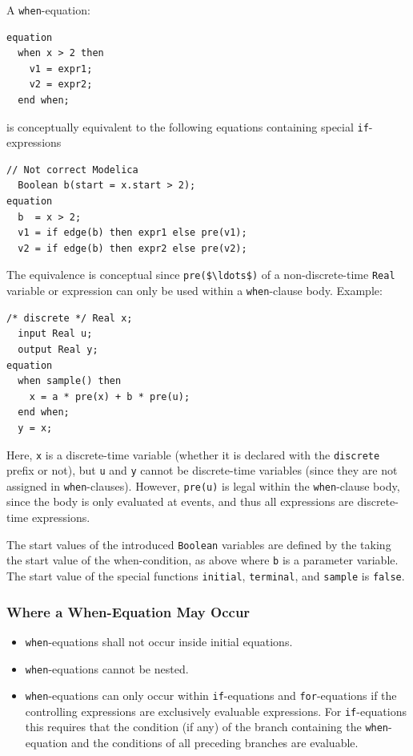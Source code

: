 A \lstinline!when!-equation:
\begin{lstlisting}[language=modelica]
equation
  when x > 2 then
    v1 = expr1;
    v2 = expr2;
  end when;
\end{lstlisting}
is conceptually equivalent to the following equations containing special \lstinline!if!-expressions
\begin{lstlisting}[language=modelica]
  // Not correct Modelica
  Boolean b(start = x.start > 2);
equation
  b  = x > 2;
  v1 = if edge(b) then expr1 else pre(v1);
  v2 = if edge(b) then expr2 else pre(v2);
\end{lstlisting}

\begin{nonnormative}
The equivalence is conceptual since \lstinline!pre($\ldots$)! of a non-discrete-time \lstinline!Real! variable or expression can only be used within a \lstinline!when!-clause body.
Example:
\begin{lstlisting}[language=modelica]
  /* discrete */ Real x;
  input Real u;
  output Real y;
equation
  when sample() then
    x = a * pre(x) + b * pre(u);
  end when;
  y = x;
\end{lstlisting}

Here, \lstinline!x! is a discrete-time variable (whether it is declared with the \lstinline!discrete! prefix or not), but \lstinline!u! and \lstinline!y! cannot be discrete-time variables
(since they are not assigned in \lstinline!when!-clauses).
However, \lstinline!pre(u)! is legal within the \lstinline!when!-clause body, since the body is only evaluated at events, and thus all expressions are discrete-time expressions.
\end{nonnormative}

The start values of the introduced \lstinline!Boolean! variables are defined by the taking the start value of the when-condition, as above where \lstinline!b! is a parameter variable.
The start value of the special functions \lstinline!initial!, \lstinline!terminal!, and \lstinline!sample! is \lstinline!false!.


\subsubsection{Where a When-Equation May Occur}\label{restrictions-on-where-a-when-equation-may-occur}\label{where-a-when-equation-may-occur}

\begin{itemize}
\item
  \lstinline!when!-equations shall not occur inside initial equations.
\item
  \lstinline!when!-equations cannot be nested.
\item
  \lstinline!when!-equations can only occur within \lstinline!if!-equations and \lstinline!for!-equations if the controlling expressions are exclusively evaluable expressions.
  For \lstinline!if!-equations this requires that the condition (if any) of the branch containing the \lstinline!when!-equation and the conditions of all preceding branches are evaluable.
\end{itemize}

